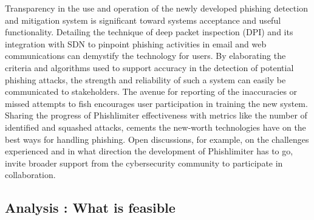 \begin{itemize}
Transparency in the use and operation of the newly developed phishing detection and mitigation system is significant toward systems acceptance and useful functionality. Detailing the technique of deep packet inspection (DPI) and its integration with SDN to pinpoint phishing activities in email and web communications can demystify the technology for users. By elaborating the criteria and algorithms used to support accuracy in the detection of potential phishing attacks, the strength and reliability of such a system can easily be communicated to stakeholders. The avenue for reporting of the inaccuracies or missed attempts to fish encourages user participation in training the new system. Sharing the progress of Phishlimiter effectiveness with metrics like the number of identified and squashed attacks, cements the new-worth technologies have on the best ways for handling phishing. Open discussions, for example, on the challenges experienced and in what direction the development of Phishlimiter has to go, invite broader support from the cybersecurity community to participate in collaboration.

\end{itemize}

\subsection{Analysis : What is feasible }

